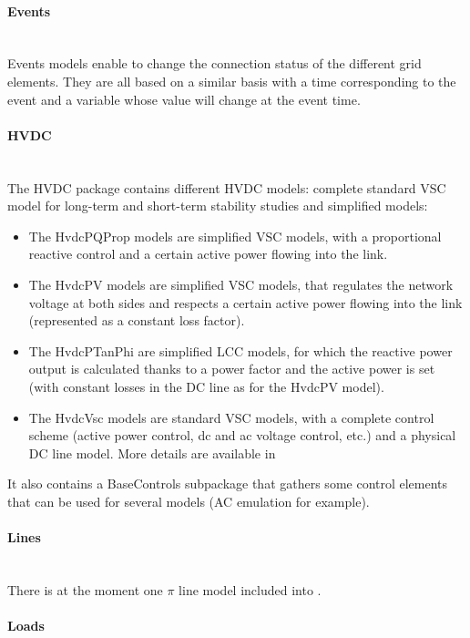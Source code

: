 \documentclass[a4paper, 12pt]{report}
\begin{document}
\paragraph{Events}
~~\\

Events models enable to change the connection status of the different grid elements. They are all based on a similar basis with a time corresponding to the event and a variable whose value will change at the event time.

\paragraph{HVDC}
~~\\

The HVDC package contains different HVDC models: complete standard VSC model for long-term and short-term stability studies and simplified models:
\begin{itemize}
\item The HvdcPQProp models are simplified VSC models, with a proportional reactive control and a certain active power flowing into the link.
\item The HvdcPV models are simplified VSC models, that regulates the network voltage at both sides and respects a certain active power flowing into the link (represented as a constant loss factor).
\item The HvdcPTanPhi are simplified LCC models, for which the reactive power output is calculated thanks to a power factor and the active power is set (with constant losses in the DC line as for the HvdcPV model).
\item The HvdcVsc models are standard VSC models, with a complete control scheme (active power control, dc and ac voltage control, etc.) and a physical DC line model. More details are available in \cite{AverageHVDC}
\end{itemize}
It also contains a BaseControls subpackage that gathers some control elements that can be used for several models (AC emulation for example).

\paragraph{Lines}
~~\\

There is at the moment one $\pi$ line model included into \Dynawo.

\paragraph{Loads}
~~\\
\end{document}
